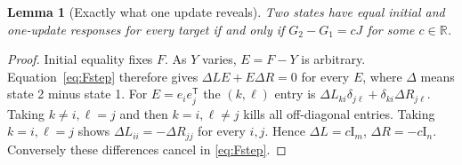 \documentclass[11pt]{article}
\newtheorem{lemma}[theorem]{Lemma}
\theoremstyle{remark}\newtheorem{remark}[theorem]{Remark}
\newcommand{\R}{\mathbb R}
\newcommand{\Id}{\mathrm I}
\begin{document}
\begin{lemma}[Exactly what one update reveals]\label{lem:one}
Two states have equal initial and one-update responses for every target
if and only if $G_2-G_1=cJ$ for some $c\in\R$.
\end{lemma}
\begin{proof}
Initial equality fixes $F$. As $Y$ varies, $E=F-Y$ is arbitrary.
Equation~\eqref{eq:Fstep} therefore gives
$\Delta L E+E\Delta R=0$ for every $E$, where $\Delta$ means state 2
minus state 1. For $E=e_i e_j^{\mathsf T}$ the $(k,\ell)$ entry is
$\Delta L_{ki}\delta_{j\ell}+\delta_{ki}\Delta R_{j\ell}$.
Taking $k\ne i,\ell=j$ and then $k=i,\ell\ne j$ kills all off-diagonal
entries. Taking $k=i,\ell=j$ shows
$\Delta L_{ii}=-\Delta R_{jj}$ for every $i,j$. Hence
$\Delta L=c\Id_m$, $\Delta R=-c\Id_n$. Conversely these differences
cancel in \eqref{eq:Fstep}.
\end{proof}
\end{document}
